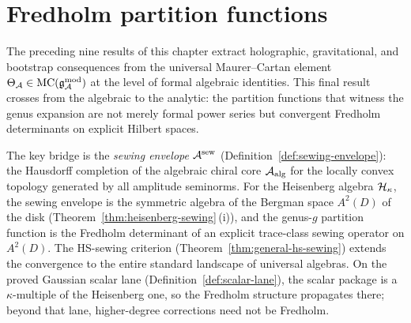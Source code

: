 %

\providecommand{\Bergman}{\mathcal{B}}
\providecommand{\Fock}{\mathcal{F}}
\providecommand{\Hilb}{\mathcal{H}\!\mathit{ilb}}
\providecommand{\sewop}{T}
\providecommand{\sewker}{K}
\providecommand{\trcl}{\mathcal{L}^1}
\providecommand{\hscl}{\mathcal{L}^2}
\providecommand{\freddet}{\mathrm{det}_{\mathrm{Fred}}}
\providecommand{\Wick}{\mathcal{W}}
\providecommand{\Bergker}{\mathsf{B}}
\providecommand{\primeform}{E}
\providecommand{\collar}{\mathfrak{c}}
\providecommand{\sewenv}{\cA^{\mathrm{sew}}}
\providecommand{\anbar}{\barB^{\mathrm{an}}}
\providecommand{\algcore}{\cA_{\mathrm{alg}}}
\providecommand{\codercat}{D^{\mathrm{co}}}
\providecommand{\contrcat}{D^{\mathrm{ctr}}}
\providecommand{\graphnorm}{\|\cdot\|_{\mathrm{graph}}}
\providecommand{\secquant}{\Gamma}
\providecommand{\hodgebdle}{\mathbb{E}}
\providecommand{\hodgedet}{\det\hodgebdle}
\providecommand{\zetareg}{\det\nolimits'_\zeta}
\providecommand{\dedeta}{\eta}
\providecommand{\Sp}{\mathrm{Sp}}
\providecommand{\Siegel}{\mathfrak{H}}
\providecommand{\OPEcoeff}{C}

\section{Fredholm partition functions}
\label{sec:thqg-fredholm-partition-functions}

The preceding nine results of this chapter extract holographic,
gravitational, and bootstrap consequences from the universal
Maurer--Cartan element
$\Theta_{\mathcal{A}} \in \mathrm{MC}(\mathfrak{g}_{\mathcal{A}}^{\mathrm{mod}})$
at the level of formal algebraic identities. This final result
crosses from the algebraic to the analytic: the partition functions
that witness the genus expansion are not merely formal power series
but convergent Fredholm determinants on explicit Hilbert spaces.

The key bridge is the \emph{sewing envelope}
$\sewenv$
(Definition~\ref{def:sewing-envelope}): the Hausdorff completion
of the algebraic chiral core $\algcore$ for the locally convex
topology generated by all amplitude seminorms. For the Heisenberg
algebra $\mathcal{H}_\kappa$, the sewing envelope is the symmetric algebra
of the Bergman space $A^2(D)$ of the disk
(Theorem~\ref{thm:heisenberg-sewing}\,(i)), and the genus-$g$
partition function is the Fredholm determinant of an explicit
trace-class sewing operator on $A^2(D)$. The HS-sewing criterion
(Theorem~\ref{thm:general-hs-sewing}) extends the convergence to
the entire standard landscape of universal algebras. On the proved
Gaussian scalar lane
\textup{(}Definition~\ref{def:scalar-lane}\textup{)},
the scalar package is a $\kappa$-multiple of the Heisenberg one, so
the Fredholm structure propagates there; beyond that lane, higher-degree
corrections need not be Fredholm.

